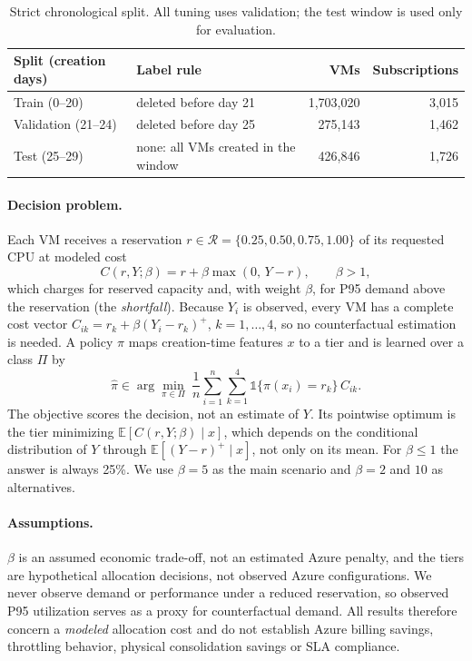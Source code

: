 \documentclass[10pt]{article}
\newcommand{\Ex}{\mathbb{E}}
\begin{document}
\begin{table}[h]
\centering\small
\caption{Strict chronological split. All tuning uses validation; the test window is used only for evaluation.}
\label{tab:split}
\begin{tabular}{llrr}
\toprule
Split (creation days) & Label rule & VMs & Subscriptions \\
\midrule
Train (0--20) & deleted before day 21 & 1,703,020 & 3,015 \\
Validation (21--24) & deleted before day 25 & 275,143 & 1,462 \\
Test (25--29) & none: all VMs created in the window & 426,846 & 1,726 \\
\bottomrule
\end{tabular}
\end{table}

\paragraph{Decision problem.} Each VM receives a reservation $r\in\mathcal{R}=\{0.25,0.50,0.75,1.00\}$ of its requested CPU at modeled cost
\begin{equation}
C(r,Y;\beta)=r+\beta\max(0,\,Y-r),\qquad \beta>1,
\label{eq:cost}
\end{equation}
which charges for reserved capacity and, with weight $\beta$, for P95 demand above the reservation (the \emph{shortfall}). Because $Y_i$ is observed, every VM has a complete cost vector $C_{ik}=r_k+\beta(Y_i-r_k)^+$, $k=1,\dots,4$, so no counterfactual estimation is needed. A policy $\pi$ maps creation-time features $x$ to a tier and is learned over a class $\Pi$ by
\begin{equation}
\hat\pi\in\arg\min_{\pi\in\Pi}\ \frac{1}{n}\sum_{i=1}^n\sum_{k=1}^4 \mathbb{1}\{\pi(x_i)=r_k\}\,C_{ik}.
\label{eq:erm}
\end{equation}
The objective scores the decision, not an estimate of $Y$. Its pointwise optimum is the tier minimizing $\Ex[C(r,Y;\beta)\mid x]$, which depends on the conditional distribution of $Y$ through $\Ex[(Y-r)^+\mid x]$, not only on its mean. For $\beta\le1$ the answer is always 25\%. We use $\beta=5$ as the main scenario and $\beta=2$ and $10$ as alternatives.

\paragraph{Assumptions.} $\beta$ is an assumed economic trade-off, not an estimated Azure penalty, and the tiers are hypothetical allocation decisions, not observed Azure configurations. We never observe demand or performance under a reduced reservation, so observed P95 utilization serves as a proxy for counterfactual demand. All results therefore concern a \emph{modeled} allocation cost and do not establish Azure billing savings, throttling behavior, physical consolidation savings or SLA compliance.
\end{document}

